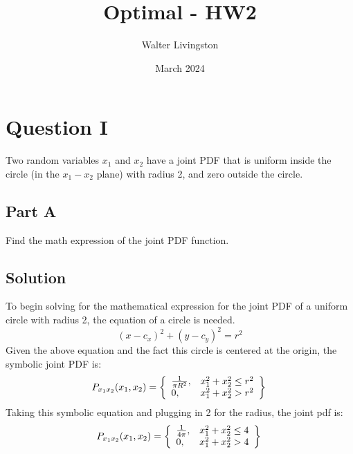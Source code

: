 \documentclass{article}
\title{Optimal - HW2}
\author{Walter Livingston}
\date{March 2024}
\begin{document}
\maketitle

\section*{Question I}
Two random variables $x_1$ and $x_2$ have a joint PDF that is uniform inside the circle (in the $x_1-x_2$ plane) with radius 2, and zero
outside the circle.
\subsection*{Part A}
Find the math expression of the joint PDF function.
\subsection*{Solution}
To begin solving for the mathematical expression for the joint PDF of a uniform circle with radius 2, the equation of a circle is needed.
\begin{equation}
    (x - c_x)^2 + (y - c_y)^2 = r^2
\end{equation}
Given the above equation and the fact this circle is centered at the origin, the symbolic joint PDF is:
\begin{equation}
    P_{x_1x_2}(x_1,x_2) = \left\{
                            \begin{array}{lr}
                                \frac{1}{\pi R^2}, & x_1^2 + x_2^2 \leq r^2\\
                                0, & x_1^2 + x_2^2 > r^2\\
                            \end{array}
                        \right\}\\
\end{equation}
Taking this symbolic equation and plugging in 2 for the radius, the joint pdf is:
\begin{equation}
    P_{x_1x_2}(x_1,x_2) = \left\{
                            \begin{array}{lr}
                                \frac{1}{4\pi}, & x_1^2 + x_2^2 \leq 4\\
                                0, & x_1^2 + x_2^2 > 4\\
                            \end{array}
                        \right\}\\
\end{equation}
\end{document}
